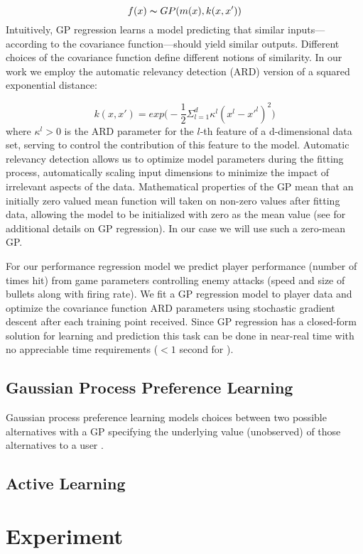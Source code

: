 \documentclass[letterpaper]{article}
\begin{document}
$$ f(x) \thicksim GP( m(x), k(x,x') ) $$
Intuitively, GP regression learns a model predicting that similar inputs---according to the covariance function---should yield similar outputs. Different choices of the covariance function define different notions of similarity. In our work we employ the automatic relevancy detection (ARD) version of a squared exponential distance:

$$ k(x,x') = exp\big( -\frac{1}{2} \Sigma_{l=1}^{d} \kappa^{l} (x^{l} - x'^{l})^2 \big) $$
where $\kappa^{l} > 0$ is the ARD parameter for the $l$-th feature of a {d}-dimensional data set, serving to control the contribution of this feature to the model. Automatic relevancy detection allows us to optimize model parameters during the fitting process, automatically scaling input dimensions to minimize the impact of irrelevant aspects of the data. Mathematical properties of the GP mean that an initially zero valued mean function will taken on non-zero values after fitting data, allowing the model to be initialized with zero as the mean value (see \cite{rasmussen2006} for additional details on GP regression). In our case we will use such a zero-mean GP.

For our performance regression model we predict player performance (number of times hit) from game parameters controlling enemy attacks (speed and size of bullets along with firing rate). We fit a GP regression model to player data and optimize the covariance function ARD parameters using stochastic gradient descent after each training point received. Since GP regression has a closed-form solution for learning and prediction this task can be done in near-real time with no appreciable time requirements ($< 1$ second for ).

\subsection{Gaussian Process Preference Learning}
Gaussian process preference learning models choices between two possible alternatives with a GP specifying the underlying value (unobserved) of those alternatives to a user \cite{chu2005}.

\cite{brochu2010:thesis}


\subsection{Active Learning}
\cite{settles2012:al-book}


\section{Experiment}
\end{document}
